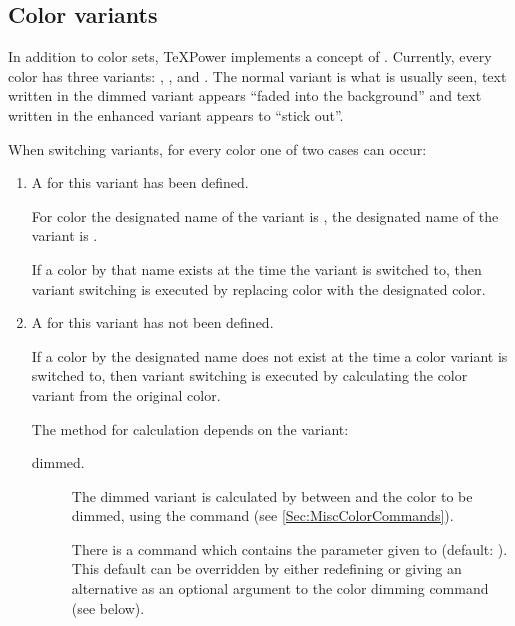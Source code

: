 \begin{slide}
  \newslide

  \subsection{Color variants}\label{Sec:ColorVariants}
  In addition to color sets, \TeX Power implements a concept of . Currently, every color has three
  variants: , , and . The normal variant is what is usually seen, text
  written in the dimmed variant appears ``faded into the background'' and text written in the enhanced variant appears
  to ``stick out''.

  \newslide

  When switching variants, for every color one of two cases can occur:
  \begin{enumerate}
  \item A  for this variant has been defined.

    For color  the designated name of the 
     variant is , the designated
    name of the  variant is
    .

    If a color by that name exists at the time the variant is switched to, then variant switching is executed by
    replacing color  with the designated color.

    \newslide

  \item A  for this variant has not been defined.

    If a color by the designated name does not exist at the time a color variant is switched to, then variant switching
    is executed by  calculating the color variant from the original color.

    The method for calculation depends on the variant:

    \newslide

    \begin{description}
    \item[dimmed.] The dimmed variant is calculated by  between  and the color to
      be dimmed, using the  command (see \ref{Sec:MiscColorCommands}).

      There is a command 
      which contains the parameter  given to 
      (default: ).  This default can be overridden by either redefining
       or giving an alternative  as an optional
      argument to the color dimming command (see below).


\end{description}
\end{enumerate}
\end{slide}
